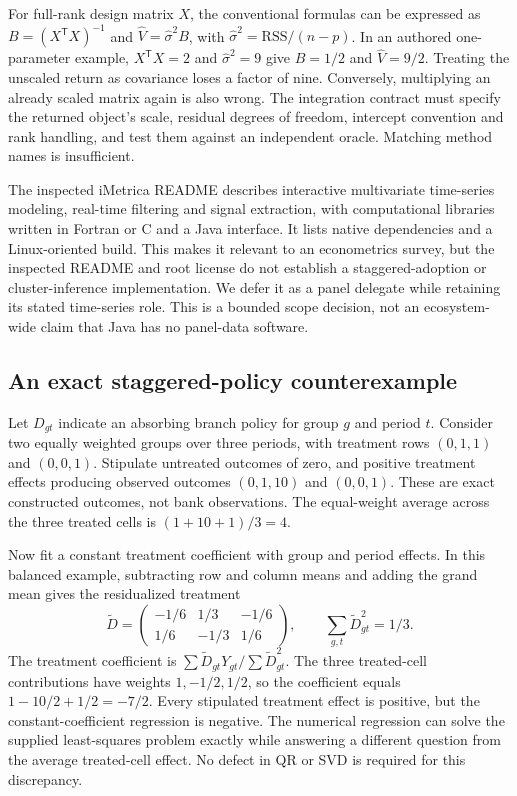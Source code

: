 For full-rank design matrix $X$, the conventional formulas can be expressed
as $B=(X^\mathsf{T}X)^{-1}$ and $\widehat V=\widehat\sigma^2 B$, with
$\widehat\sigma^2=\mathrm{RSS}/(n-p)$. In an authored one-parameter
example, $X^\mathsf{T}X=2$ and $\widehat\sigma^2=9$ give $B=1/2$ and
$\widehat V=9/2$. Treating the unscaled return as covariance loses a factor
of nine. Conversely, multiplying an already scaled matrix again is also wrong.
The integration contract must specify the returned object's scale, residual
degrees of freedom, intercept convention and rank handling, and test them
against an independent oracle. Matching method names is insufficient.
\citep{exec25_paneljava_reference}

The inspected iMetrica README describes interactive multivariate time-series
modeling, real-time filtering and signal extraction, with computational
libraries written in Fortran or C and a Java interface. It lists native
dependencies and a Linux-oriented build. This makes it relevant to an
econometrics survey, but the inspected README and root license do not
establish a staggered-adoption or cluster-inference implementation. We defer
it as a panel delegate while retaining its stated time-series role. This is
a bounded scope decision, not an ecosystem-wide claim that Java has no
panel-data software.\citep{exec25_paneljava_imetrica}

\subsection{An exact staggered-policy counterexample}
Let $D_{gt}$ indicate an absorbing branch policy for group $g$ and period $t$.
Consider two equally weighted groups over three periods, with treatment rows
$(0,1,1)$ and $(0,0,1)$. Stipulate untreated outcomes of zero, and positive
treatment effects producing observed outcomes $(0,1,10)$ and $(0,0,1)$.
These are exact constructed outcomes, not bank observations. The equal-weight
average across the three treated cells is $(1+10+1)/3=4$.
\citep{exec25_paneljava_reference}

Now fit a constant treatment coefficient with group and period effects. In
this balanced example, subtracting row and column means and adding the grand
mean gives the residualized treatment
\[
\widetilde D=
\begin{pmatrix}-1/6&1/3&-1/6\\1/6&-1/3&1/6\end{pmatrix},
\qquad \sum_{g,t}\widetilde D_{gt}^2=1/3.
\]
The treatment coefficient is $\sum\widetilde D_{gt}Y_{gt}/
\sum\widetilde D_{gt}^2$. The three treated-cell contributions have weights
$1,-1/2,1/2$, so the coefficient equals
$1-10/2+1/2=-7/2$. Every stipulated treatment effect is positive, but the
constant-coefficient regression is negative. The numerical regression can
solve the supplied least-squares problem exactly while answering a different
question from the average treated-cell effect. No defect in QR or SVD is
required for this discrepancy.\citep{exec25_paneljava_reference}

